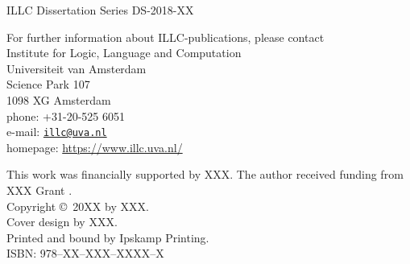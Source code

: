 {\pagestyle{empty}
\newcommand{\printtitle}{%
\begin{center}
  \linespread{1.2}
  \Huge
  \textbf{\mytitle}
\end{center}
}
\begin{titlepage}
\par\vskip 2cm
\begin{center}
\printtitle
\vfill
{\LARGE\textbf{\myshortauthor}}
\vskip 2cm
\end{center}
\end{titlepage}

\mbox{}\newpage
\setcounter{page}{1}

\par\vskip 2cm
\printtitle

\clearpage
\par\vskip 2cm
\begin{center}
ILLC Dissertation Series DS-2018-XX %
\par\vspace{2cm}
\illclogo{10cm}
\par\vspace{2cm}
\noindent%
For further information about ILLC-publications, please contact\\[2ex]
Institute for Logic, Language and Computation\\
Universiteit van Amsterdam\\
Science Park 107\\
1098 XG Amsterdam\\
phone: +31-20-525 6051\\
e-mail: \href{mailto:illc@uva.nl}{\texttt{illc@uva.nl}}\\
homepage: \url{https://www.illc.uva.nl/}
\end{center}
\vfill

%
\noindent%
This work was financially supported by XXX.
The author received funding from XXX Grant  .\\[4em]
Copyright \copyright\ 20XX by XXX.\\[2ex] %
Cover design by XXX.\\[2ex] %
Printed and bound by Ipskamp Printing.\\[2ex] %
ISBN\@: 978--XX--XXX--XXXX--X %

}
